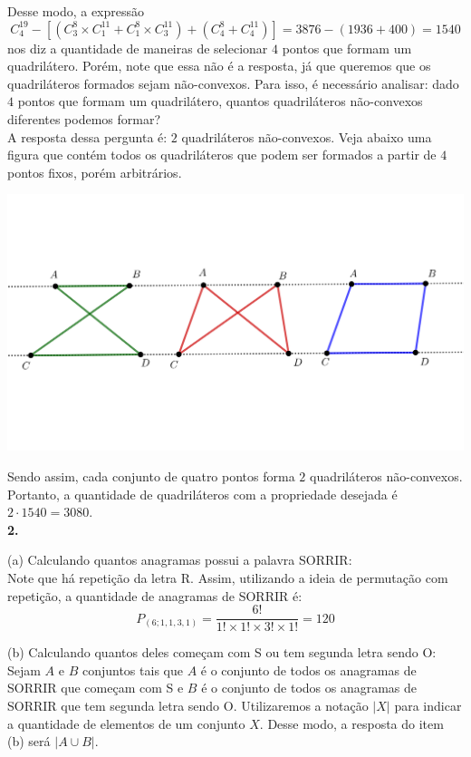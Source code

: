 \documentclass[12pt, a4paper]{article}
\begin{document}
Desse modo,  a expressão \[C^{19}_{4} - [(C^{8}_{3}\times C^{11}_{1} + C^{8}_{1}\times C^{11}_{3}) + (C^{8}_{4} + C^{11}_{4})]=3876-(1936+400)=1540\] nos diz a quantidade de maneiras de selecionar \(4\) pontos que formam um quadrilátero. Porém, note que essa não é a resposta, já  que queremos que os quadriláteros formados sejam não-convexos. Para isso, é necessário analisar: dado \(4\) pontos que formam um quadrilátero, quantos quadriláteros não-convexos diferentes podemos formar?\\

A resposta dessa pergunta é: \(2\) quadriláteros não-convexos. Veja abaixo uma figura que contém todos os quadriláteros que podem ser formados a partir de \(4\) pontos fixos, porém arbitrários. 
\begin{center}
\includegraphics[scale=0.5]{fig_quad}
\end{center}
Sendo assim, cada conjunto de quatro pontos forma \(2\) quadriláteros não-convexos. Portanto, a quantidade de quadriláteros com a propriedade desejada é \(2 \cdot{1540} = 3080\). \\

\textbf{2.}

(a) Calculando quantos anagramas possui a palavra SORRIR: \\

Note que há repetição da letra R. Assim, utilizando a ideia de permutação com repetição, a quantidade de anagramas de SORRIR é: \[P_{(6;1,1,3,1)} = \dfrac{6!}{1! \times 1! \times 3! \times 1!} = 120\]

(b) Calculando quantos deles começam com S ou tem segunda letra sendo O: \\

Sejam \(A\) e \(B\) conjuntos tais que \(A\) é o conjunto de todos os anagramas de SORRIR que começam com S e \(B\) é o conjunto de todos os anagramas de SORRIR que tem segunda letra sendo O. Utilizaremos a notação \(|X|\) para indicar a quantidade de elementos de um conjunto \(X\). Desse modo, a resposta do item (b) será \(\left|A \cup B \right|\). \\
\end{document}
